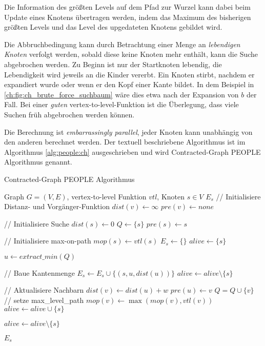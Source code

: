 Die Information des größten Levels auf dem Pfad zur Wurzel kann dabei beim Update eines Knotens übertragen werden, indem das Maximum des bisherigen größten Levels und das Level des upgedateten Knotens gebildet wird.


Die Abbruchbedingung kann durch Betrachtung einer Menge an \emph{lebendigen Knoten} verfolgt werden, sobald diese keine Knoten mehr enthält, kann die Suche abgebrochen werden.
Zu Beginn ist nur der Startknoten lebendig, die Lebendigkeit wird jeweils an die Kinder vererbt.
Ein Knoten stirbt, nachdem er expandiert wurde oder wenn er den Kopf einer Kante bildet.
In dem Beispiel in \autoref{ch:fig:ch_brute_force_suchbaum} wäre dies etwa nach der Expansion von $b$ der Fall.
Bei einer \emph{guten} vertex-to-level-Funktion ist die Überlegung, dass viele Suchen früh abgebrochen werden können.

Die Berechnung ist \emph{embarrassingly parallel}, jeder Knoten kann unabhängig von den anderen berechnet werden.
Der textuell beschriebene Algorithmus ist im Algorithmus \ref{alg:people:ch} ausgeschrieben und wird Contracted-Graph PEOPLE Algorithmus genannt.

\begin{algorithm}[p]
  \caption{Contracted-Graph PEOPLE Algorithmus}
  \begin{algorithmic}[1]
    \Require Graph $G = (V, E)$, vertex-to-level Funktion ${vtl}$, Knoten $s \in V$
    \Ensure $E_s$
    \State // Initialisiere Distanz- und Vorgänger-Funktion
    \State ${dist}(v) \leftarrow \infty$
    \State ${pre}(v) \leftarrow {none}$
    \EndFor

    \State
    \State // Initialisiere Suche
    \State ${dist}(s) \leftarrow 0$
    \State $Q\leftarrow \{ s \}$
    \State ${pre}(s) \leftarrow s$

    \State
    \State // Initialisiere max-on-path
    \State ${mop}(s) \leftarrow {vtl}(s)$
    \State $E_s \leftarrow \{ \}$
    \State ${alive} \leftarrow \{ s \}$

    \State
    \State $u \leftarrow{extract\_min}(Q)$\label{graphs:dijkstra:pop}

    \State
    \State // Baue Kantenmenge
    \State $E_s \leftarrow E_s \cup \{ (s, u, {dist}(u)) \}$
    \State ${alive} \leftarrow {alive} \setminus \{ s \}$
    \EndIf

    \State
    \State // Aktualisiere Nachbarn
    \State ${dist}(v) \leftarrow {dist}(u) + w$
    \State ${pre}(u) \leftarrow v$
    \State $Q = Q \cup \{ v \}$
    \State
    \State // setze max\_level\_path
    \State ${mop}(v) \leftarrow \max({mop}(v), {vtl}(v))$
    \State
    \State ${alive} \leftarrow {alive} \cup \{ s \}$
    \EndIf
    \EndIf
    \EndFor

    \State ${alive} \leftarrow {alive} \setminus \{ s \}$

    \EndWhile

    \State
    \State \Return $E_s$
  \end{algorithmic}
  \label{alg:people:ch}
\end{algorithm}

